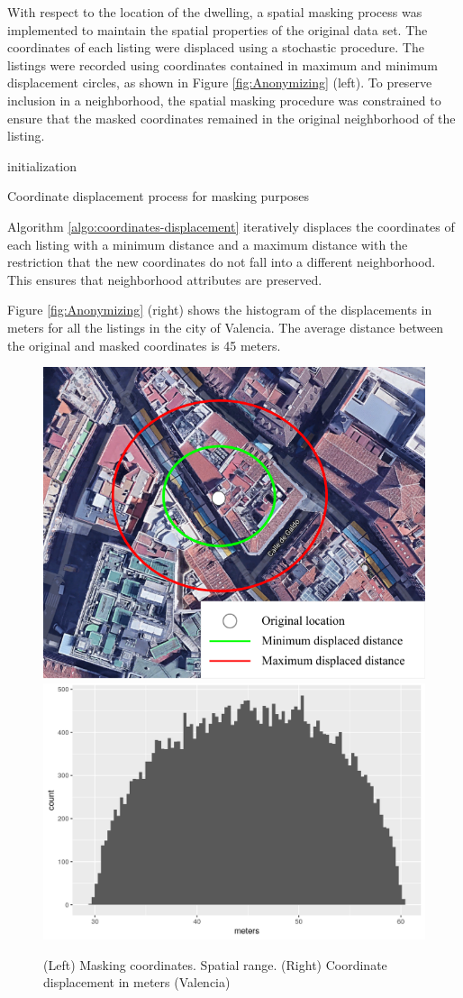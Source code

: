\documentclass[Royal,times,sageh]{sagej}
\begin{document}
With respect to the location of the dwelling, a spatial masking process
was implemented to maintain the spatial properties of the original data
set. The coordinates of each listing were displaced using a stochastic
procedure. The listings were recorded using coordinates contained in
maximum and minimum displacement circles, as shown in Figure
\ref{fig:Anonymizing} (left). To preserve inclusion in a neighborhood,
the spatial masking procedure was constrained to ensure that the masked
coordinates remained in the original neighborhood of the listing.

\begin{algorithm}[!ht]
 initialization\;
 \caption{Coordinate displacement process for masking purposes}
 \label{algo:coordinates-displacement}
\end{algorithm}

Algorithm \ref{algo:coordinates-displacement} iteratively displaces the
coordinates of each listing with a minimum distance and a maximum
distance with the restriction that the new coordinates do not fall into
a different neighborhood. This ensures that neighborhood attributes are
preserved.

Figure \ref{fig:Anonymizing} (right) shows the histogram of the
displacements in meters for all the listings in the city of Valencia.
The average distance between the original and masked coordinates is 45
meters.

\begin{figure}

{\centering \includegraphics[width=0.29\linewidth,height=0.2\textheight]{EPB_files/points-moved-image} \includegraphics[width=0.37\linewidth,height=0.2\textheight]{EPB_files/coordinates-valencia} 

}

\caption{\label{fig:Anonymizing}(Left) Masking coordinates. Spatial range. (Right) Coordinate displacement in meters (Valencia)}\label{fig:figure-masking-coordinates}
\end{figure}
\end{document}
